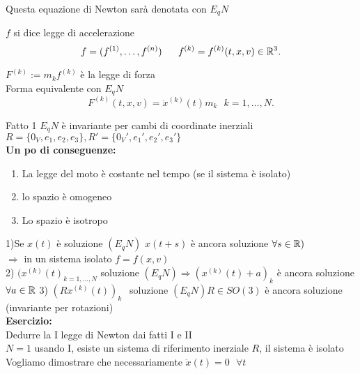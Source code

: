 \documentclass[12px]{article}
\begin{document}
Questa equazione di Newton sarà denotata con $E_q N$ 
\begin{defi}
	$f$ si dice legge di accelerazione\\
 \[
	 f = (f^{(1)},\ldots, f^{(n)}) \ \ \ \ \ f^{(k)} = f^{(k)}(t,x,v)\in\R^3
.\] 
\end{defi}
\begin{defi}
	$F^{(k)}:=m_k f^{(k)}$ è la legge di forza\\
	Forma equivalente con $E_qN$\\
	 \[
		 F^{(k)}(t,x,v) = \ddot x^{(k)}(t)m_k \ \ \ k = 1, \ldots, N
	.\] 
\end{defi}
Fatto 1 $E_qN$ è invariante per cambi di coordinate inerziali
$R = \{0_V, e_1,e_2,e_3\}, R' = \{0_V', e_1',e_2',e_3'\}$\\
\textbf{Un po di conseguenze:}
\begin{enumerate}
	\item La legge del moto è costante nel tempo (se il sistema è isolato)
	\item lo spazio è omogeneo
	\item Lo spazio è isotropo 
\end{enumerate}
1)Se $x(t)$ è soluzione $(E_qN)$  $x(t + s)$ è ancora soluzione $\forall s\in \mathbb{R})$\\
 $ \Rightarrow$ in un sistema isolato $f = f(x,v)$ \\
 2) $(x^{(k)}(t)_{k = 1,\ldots, N}$ soluzione  $(E_qN) \Rightarrow (x^{(k)}(t) + a)_k $ è ancora soluzione $\forall a\in \mathbb{R}$
 3) $(Rx^{(k)}(t))_k \ \ $ soluzione $(E_qN) R\in SO(3)$ è ancora soluzione (invariante per rotazioni) \\
 \textbf{Esercizio:}\\
Dedurre la I legge di Newton dai fatti I e II\\
$N = 1$ usando I, esiste un sistema di riferimento inerziale  $R$, il sistema è isolato\\
 Vogliamo dimostrare che necessariamente  $\ddot x(t) = 0\ \ \ \forall t$\\
\end{document}
